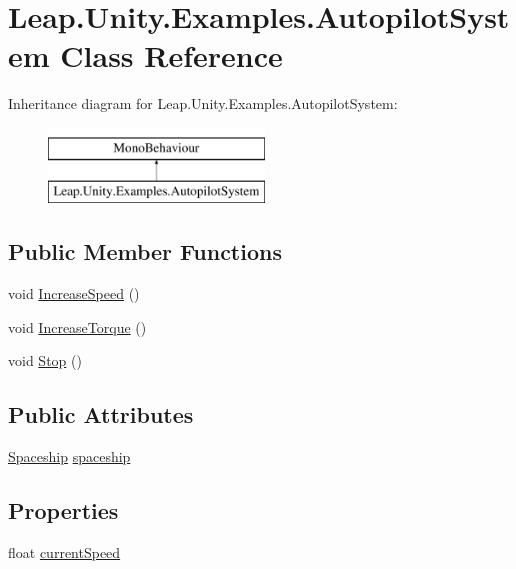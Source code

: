 \hypertarget{class_leap_1_1_unity_1_1_examples_1_1_autopilot_system}{}\section{Leap.\+Unity.\+Examples.\+Autopilot\+System Class Reference}
\label{class_leap_1_1_unity_1_1_examples_1_1_autopilot_system}
Inheritance diagram for Leap.\+Unity.\+Examples.\+Autopilot\+System\+:\begin{figure}[H]
\begin{center}
\leavevmode
\includegraphics[height=2.000000cm]{class_leap_1_1_unity_1_1_examples_1_1_autopilot_system}
\end{center}
\end{figure}
\subsection*{Public Member Functions}
\begin{DoxyCompactItemize}
\item 
void \mbox{\hyperlink{class_leap_1_1_unity_1_1_examples_1_1_autopilot_system_a10d42fbf03b404333ff81bde5c36f09b}{Increase\+Speed}} ()
\item 
void \mbox{\hyperlink{class_leap_1_1_unity_1_1_examples_1_1_autopilot_system_aedf8a8ca7ae093d10d682d0fb694a302}{Increase\+Torque}} ()
\item 
void \mbox{\hyperlink{class_leap_1_1_unity_1_1_examples_1_1_autopilot_system_a8aac51c2bfb32144eb9ba7b0eec35368}{Stop}} ()
\end{DoxyCompactItemize}
\subsection*{Public Attributes}
\begin{DoxyCompactItemize}
\item 
\mbox{\hyperlink{class_leap_1_1_unity_1_1_examples_1_1_spaceship}{Spaceship}} \mbox{\hyperlink{class_leap_1_1_unity_1_1_examples_1_1_autopilot_system_aeae748ca3a371415322c9508acd985b6}{spaceship}}
\end{DoxyCompactItemize}
\subsection*{Properties}
\begin{DoxyCompactItemize}
\item 
float \mbox{\hyperlink{class_leap_1_1_unity_1_1_examples_1_1_autopilot_system_a5007598c6b35c5eb416e6c21347ca3e0}{current\+Speed}}
\end{DoxyCompactItemize}


